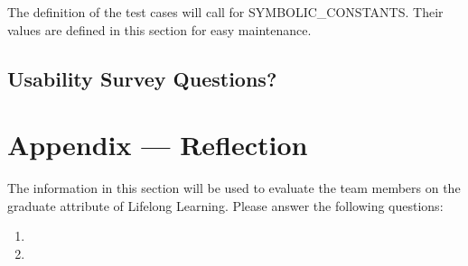 \documentclass[12pt, titlepage]{article}
\begin{document}
The definition of the test cases will call for SYMBOLIC\_CONSTANTS.
Their values are defined in this section for easy maintenance.

\subsection{Usability Survey Questions?}


\newpage{}
\section*{Appendix --- Reflection}

The information in this section will be used to evaluate the team members on the
graduate attribute of Lifelong Learning.  Please answer the following questions:

\begin{enumerate}
  \item 
  \item 
\end{enumerate}
\end{document}
